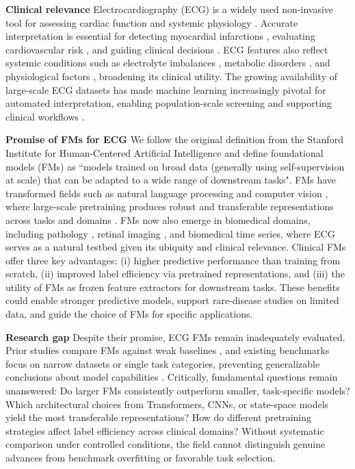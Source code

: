 \documentclass{article}
\newcommand{\heading}[1]{\noindent\textbf{#1}}
\begin{document}
    \heading{Clinical relevance} Electrocardiography (ECG) is a widely used non-invasive tool for assessing cardiac function and systemic physiology \citep{siontis2021artificial}. Accurate interpretation is essential for detecting myocardial infarctions \citep{strodthoff2020deep}, evaluating cardiovascular risk \citep{bhatia2018screening}, and guiding clinical decisions \citep{rokos2010appropriate}. ECG features also reflect systemic conditions such as electrolyte imbalances \citep{diercks2004electrocardiographic}, metabolic disorders \citep{wald2006ecg}, and physiological factors \citep{lopez2025explainable}, broadening its clinical utility. The growing availability of large-scale ECG datasets \citep{wagner2022ptbxl,gow2023mimicivecg,ribeiro2021code15} has made machine learning increasingly pivotal for automated interpretation, enabling population-scale screening \citep{kalmady2024development} and supporting clinical workflows \citep{graf2024interoperable}.
    
    \heading{Promise of FMs for ECG} We follow the original definition from the Stanford Institute for Human-Centered Artificial Intelligence \citep{bommasani2021opportunities} and define foundational models (FMs) as ``models trained on broad data (generally using self-supervision at scale) that can be adapted to a wide range of downstream tasks".
    FMs have transformed fields such as natural language processing \citep{myers2024foundation} and computer vision \citep{awais2025foundation}, where large-scale pretraining produces robust and transferable representations across tasks and domains \citep{subramanian2023towards}. FMs now also emerge in biomedical domains, including pathology \citep{chen2024towards}, retinal imaging \citep{zhou2023foundation}, and biomedical time series, where ECG serves as a natural testbed given its ubiquity and clinical relevance. Clinical FMs offer three key advantages: (i) higher predictive performance than training from scratch, (ii) improved label efficiency via pretrained representations, and (iii) the utility of FMs as frozen feature extractors for downstream tasks. These benefits could enable stronger predictive models, support rare-disease studies on limited data, and guide the choice of FMs for specific applications.


    \heading{Research gap} 
    Despite their promise, ECG FMs remain inadequately evaluated. Prior studies compare FMs against weak baselines \citep{doi:10.1056/AIoa2401033,kim2024learning,na2024guiding,10.5555/3692070.3693362}, and existing benchmarks focus on narrow datasets or single task categories, preventing generalizable conclusions about model capabilities \citep{na2024guiding,10.5555/3692070.3693362}. Critically, fundamental questions remain unanswered: Do larger FMs consistently outperform smaller, task-specific models? Which architectural choices from Transformers, CNNs, or state-space models yield the most transferable representations? How do different pretraining strategies affect label efficiency across clinical domains? Without systematic comparison under controlled conditions, the field cannot distinguish genuine advances from benchmark overfitting or favorable task selection.
\end{document}
